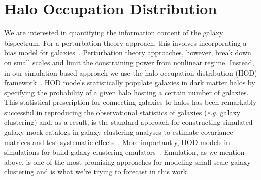 \section{Halo Occupation Distribution} \label{sec:hod}  
We are interested in quantifying the information content of the galaxy bispectrum. 
For a perturbation theory approach, this involves incorporating a bias model 
for galaxies~\citep[\emph{e.g.}][]{sefusatti2006, yankelevich2019, chudaykin2019}.
Perturbation theory approaches, however, break down on small scales and limit
the constraining power from nonlinear regime. Instead, in our simulation based 
approach we use the halo occupation distribution (HOD) 
framework~\citep[\emph{e.g.}][]{zheng2005, leauthaud2012, tinker2013, zentner2016, vakili2019}.%
HOD models statistically populate galaxies in dark matter halos by specifying
the probability of a given halo hosting a certain number of galaxies. This 
statistical prescription for connecting galaxies to halos has been remarkably 
successful in reproducing the observational statistics of galaxies (\emph{e.g.} 
galaxy clustering) and, as a result, is the standard approach for constructing 
simulated galaxy mock catalogs in galaxy clustering analyses to estimate covariance 
matrices and test systematic effects~\citep[\emph{e.g.}][]{rodriguez-torres2016, rodriguez-torres2017, beutler2017}. 
More importantly, HOD models in simulations for build galaxy clustering 
emulators~\citep[see the Aemulus project][]{mcclintock2018, zhai2018}. Emulation, 
as we mention above, is one of the most promising approaches for modeling small 
scale galaxy clustering and is what we're trying to forecast in this work. 


